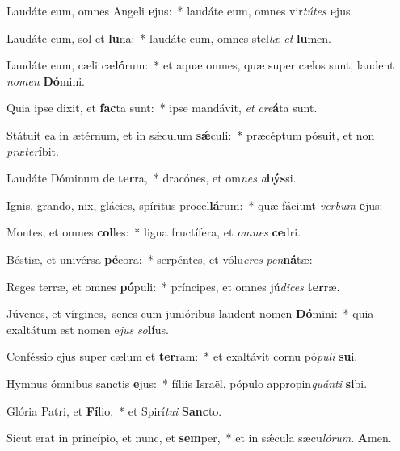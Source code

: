 Laudáte eum, omnes Angeli \textbf{e}jus:~* laudáte eum, omnes vir\textit{tú}\textit{tes} \textbf{e}jus.

Laudáte eum, sol et \textbf{lu}na:~* laudáte eum, omnes stel\textit{læ} \textit{et} \textbf{lu}men.

Laudáte eum, cæli cæ\textbf{ló}rum:~* et aquæ omnes, quæ super cælos sunt, laudent \textit{no}\textit{men} \textbf{Dó}mini.

Quia ipse dixit, et \textbf{fac}ta sunt:~* ipse mandávit, \textit{et} \textit{cre}\textbf{á}ta sunt.

Státuit ea in ætérnum, et in sǽculum \textbf{sǽ}culi:~* præcéptum pósuit, et non \textit{præ}\textit{ter}\textbf{í}bit.

Laudáte Dóminum de \textbf{ter}ra,~* dracónes, et om\textit{nes} \textit{a}\textbf{býs}si.

Ignis, grando, nix, glácies, spíritus procel\textbf{lá}rum:~* quæ fáciunt \textit{ver}\textit{bum} \textbf{e}jus:

Montes, et omnes \textbf{col}les:~* ligna fructífera, et \textit{om}\textit{nes} \textbf{ce}dri.

Béstiæ, et univérsa \textbf{pé}cora:~* serpéntes, et vólu\textit{cres} \textit{pen}\textbf{ná}tæ:

Reges terræ, et omnes \textbf{pó}puli:~* príncipes, et omnes jú\textit{di}\textit{ces} \textbf{ter}ræ.

Júvenes, et vírgines,~\reddagger senes cum junióribus laudent nomen \textbf{Dó}mini:~* quia exaltátum est nomen e\textit{jus} \textit{so}\textbf{lí}us.

Conféssio ejus super cælum et \textbf{ter}ram:~* et exaltávit cornu pó\textit{pu}\textit{li} \textbf{su}i.

Hymnus ómnibus sanctis \textbf{e}jus:~* fíliis Israël, pópulo appropin\textit{quán}\textit{ti} \textbf{si}bi.

Glória Patri, et \textbf{Fí}lio,~* et Spirí\textit{tu}\textit{i} \textbf{Sanc}to.

Sicut erat in princípio, et nunc, et \textbf{sem}per,~* et in sǽcula sæcu\textit{ló}\textit{rum}. \textbf{A}men.

